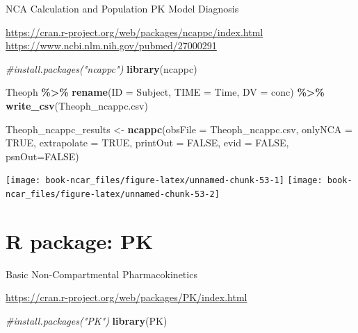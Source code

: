\documentclass[
  10pt,
]{krantz}
\makeatletter
\newenvironment{Shaded}{\begin{snugshade}}{\end{snugshade}}
\newcommand{\CommentTok}[1]{\textcolor[rgb]{0.56,0.35,0.01}{\textit{#1}}}
\newcommand{\DataTypeTok}[1]{\textcolor[rgb]{0.13,0.29,0.53}{#1}}
\newcommand{\KeywordTok}[1]{\textcolor[rgb]{0.13,0.29,0.53}{\textbf{#1}}}
\newcommand{\NormalTok}[1]{#1}
\newcommand{\OperatorTok}[1]{\textcolor[rgb]{0.81,0.36,0.00}{\textbf{#1}}}
\newcommand{\OtherTok}[1]{\textcolor[rgb]{0.56,0.35,0.01}{#1}}
\newcommand{\StringTok}[1]{\textcolor[rgb]{0.31,0.60,0.02}{#1}}
\newenvironment{kframe}{%
\medskip{}
\setlength{\fboxsep}{.8em}
 \def\at@end@of@kframe{}%
 \ifinner\ifhmode%
  \def\at@end@of@kframe{\end{minipage}}%
  \begin{minipage}{\columnwidth}%
 \fi\fi%
 \def\FrameCommand##1{\hskip\@totalleftmargin \hskip-\fboxsep
 \colorbox{shadecolor}{##1}\hskip-\fboxsep
     \hskip-\linewidth \hskip-\@totalleftmargin \hskip\columnwidth}%
 \MakeFramed {\advance\hsize-\width
   \@totalleftmargin\z@ \linewidth\hsize
   \@setminipage}}%
 {\par\unskip\endMakeFramed%
 \at@end@of@kframe}
\renewenvironment{Shaded}{\begin{kframe}}{\end{kframe}}
\makeatother
\begin{document}
NCA Calculation and Population PK Model Diagnosis \citep{Acharya201683}

\url{https://cran.r-project.org/web/packages/ncappc/index.html}
\url{https://www.ncbi.nlm.nih.gov/pubmed/27000291}

\begin{Shaded}
\begin{Highlighting}[]
\CommentTok{\#install.packages("ncappc")}
\KeywordTok{library}\NormalTok{(ncappc)}
\end{Highlighting}
\end{Shaded}

\begin{Shaded}
\begin{Highlighting}[]
\NormalTok{Theoph }\OperatorTok{\%\textgreater{}\%}\StringTok{ }
\StringTok{  }\KeywordTok{rename}\NormalTok{(}\DataTypeTok{ID =}\NormalTok{ Subject,}
         \DataTypeTok{TIME =}\NormalTok{ Time,}
         \DataTypeTok{DV =}\NormalTok{ conc) }\OperatorTok{\%\textgreater{}\%}\StringTok{ }
\StringTok{  }\KeywordTok{write\_csv}\NormalTok{(}\StringTok{\textquotesingle{}Theoph\_ncappc.csv\textquotesingle{}}\NormalTok{)}

\NormalTok{Theoph\_ncappc\_results \textless{}{-}}\StringTok{ }\KeywordTok{ncappc}\NormalTok{(}\DataTypeTok{obsFile =} \StringTok{\textquotesingle{}Theoph\_ncappc.csv\textquotesingle{}}\NormalTok{,}
       \DataTypeTok{onlyNCA =} \OtherTok{TRUE}\NormalTok{,}
       \DataTypeTok{extrapolate =} \OtherTok{TRUE}\NormalTok{,}
       \DataTypeTok{printOut =} \OtherTok{FALSE}\NormalTok{,}
       \DataTypeTok{evid =} \OtherTok{FALSE}\NormalTok{,}
       \DataTypeTok{psnOut=}\OtherTok{FALSE}\NormalTok{)}
\end{Highlighting}
\end{Shaded}

\texttt{[image: book-ncar\_files/figure-latex/unnamed-chunk-53-1]}
\texttt{[image: book-ncar\_files/figure-latex/unnamed-chunk-53-2]}

\hypertarget{r-package-pk}{%
\section{R package: PK}\label{r-package-pk}}

Basic Non-Compartmental Pharmacokinetics

\url{https://cran.r-project.org/web/packages/PK/index.html}

\begin{Shaded}
\begin{Highlighting}[]
\CommentTok{\#install.packages("PK")}
\KeywordTok{library}\NormalTok{(PK)}
\end{Highlighting}
\end{Shaded}
\end{document}
